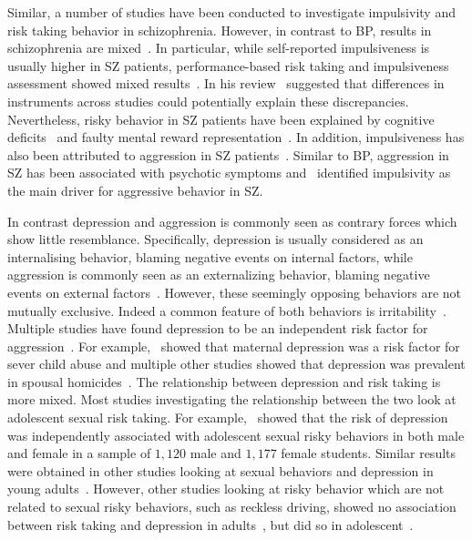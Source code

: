 Similar, a number of studies have been conducted to investigate impulsivity and risk taking behavior in schizophrenia.
However, in contrast to BP, results in schizophrenia are mixed~\cite{Reddy2014}.
In particular, while self-reported impulsiveness is usually higher in SZ patients, performance-based risk taking and impulsiveness assessment showed mixed results~\cite{Ouzir2013}.
In his review~\citet{Ouzir2013} suggested that differences in instruments across studies could potentially explain these discrepancies.
Nevertheless, risky behavior in SZ patients have been explained by cognitive deficits~\cite{Cheng2012} and faulty mental reward representation~\cite{Heerey2011}.
In addition, impulsiveness has also been attributed to aggression in SZ patients~\cite{Hoptman2015}.
Similar to BP, aggression in SZ has been associated with psychotic symptoms and~\citet{Hoptman2015} identified impulsivity as the main driver for aggressive behavior in SZ\@.


In contrast depression and aggression is commonly seen as contrary forces which show little resemblance.
Specifically, depression is usually considered as an internalising behavior, blaming negative events on internal factors, while aggression is commonly seen as an externalizing behavior, blaming negative events on external factors~\cite{APA1994,AmericanPsychiatricAssociation2013}.
However, these seemingly opposing behaviors are not mutually exclusive. 
Indeed a common feature of both behaviors is irritability~\cite{Dutton2013}.
Multiple studies have found depression to be an independent risk factor for aggression~\cite{Sher2005,Roland2002,Taft2009, Dutton2013}.
For example,~\citet{Windham2004} showed that maternal depression was a risk factor for sever child abuse and multiple other studies showed that depression was prevalent in spousal homicides~\cite{Stith2004}.
The relationship between depression and risk taking is more mixed.
Most studies investigating the relationship between the two look at adolescent sexual risk taking.
For example,~\citet{Wilson2010} showed that the risk of depression was independently associated with adolescent sexual risky behaviors in both male and female in a sample of $1,120$ male and $1,177$ female students.
Similar results were obtained in other studies looking at sexual behaviors and depression in young adults~\cite{Auerbach2010,Auerbach2007,Othieno2015}.
However, other studies looking at risky behavior which are not related to sexual risky behaviors, such as reckless driving, showed no association between risk taking and depression in adults~\cite{Vassallo2008}, but did so in adolescent~\cite{McDonald2014}. 

